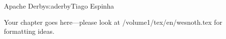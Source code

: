 \begin{aosachapter}{Apache Derby}{s:aderby}{Tiago Espinha}

Your chapter goes here---please look at /volume1/tex/en/wesnoth.tex 
for formatting ideas.

\end{aosachapter}
